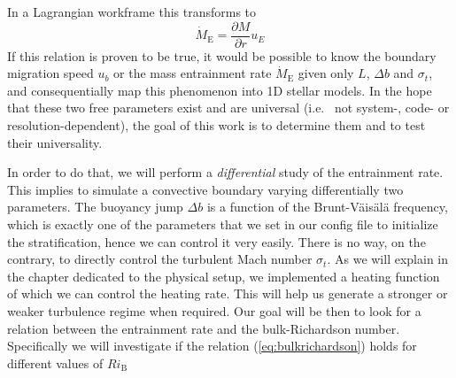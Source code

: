 In a Lagrangian workframe this transforms to
\begin{equation}
	\dot{M}_\mathrm{E}=\frac{\partial M}{\partial r} u_E
\end{equation}
If this relation is proven to be true, it would be possible to know the boundary migration speed $u_b$ or the mass entrainment rate $\dot{M}_\mathrm{E}$ given only $L$, $\Delta b$ and $\sigma_t$, and consequentially map this phenomenon into 1D stellar models. In the hope that these two free parameters exist and are universal (i.e. \ not system-, code- or resolution-dependent), the goal of this work is to determine them and to test their universality.

In order to do that, we will perform a \textit{differential} study of the entrainment rate. This implies to simulate a convective boundary varying differentially two parameters. The buoyancy jump $\Delta b$ is a function of the Brunt-Väisälä frequency, which is exactly one of the parameters that we set in our config file to initialize the stratification, hence we can control it very easily. There is no way, on the contrary, to directly control the turbulent Mach number $\sigma_t$. As we will explain in the chapter dedicated to the physical setup, we implemented a heating function of which we can control the heating rate. This will help us generate a stronger or weaker turbulence regime when required. Our goal will be then to look for a relation between the entrainment rate and the bulk-Richardson number. Specifically we will investigate if the relation (\ref{eq:bulkrichardson}) holds for different values of $Ri_{\mathrm{B}}$


